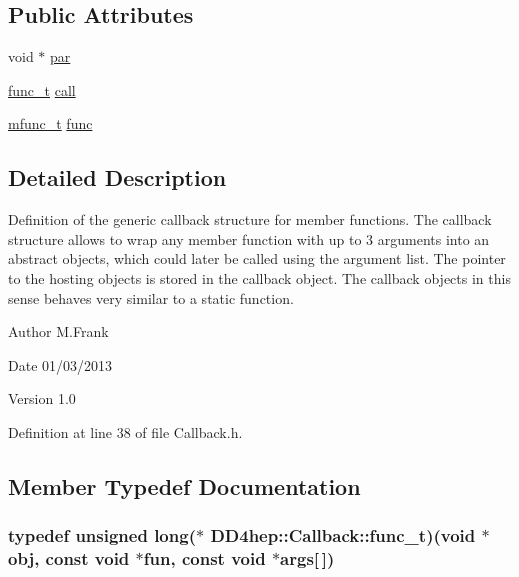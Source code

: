 \subsection*{Public Attributes}
\begin{DoxyCompactItemize}
\item 
void $\ast$ \hyperlink{class_d_d4hep_1_1_callback_a0a6ca86dc357627c3c8e9f6233444733}{par}
\item 
\hyperlink{class_d_d4hep_1_1_callback_a3b7cb36fa166495663680601ba5d7fe0}{func\_\-t} \hyperlink{class_d_d4hep_1_1_callback_af278c88d3680465912b88ad74b0d4cff}{call}
\item 
\hyperlink{struct_d_d4hep_1_1_callback_1_1mfunc__t}{mfunc\_\-t} \hyperlink{class_d_d4hep_1_1_callback_a9998721dd74f6377d4c5e71629411426}{func}
\end{DoxyCompactItemize}


\subsection{Detailed Description}
Definition of the generic callback structure for member functions. The callback structure allows to wrap any member function with up to 3 arguments into an abstract objects, which could later be called using the argument list. The pointer to the hosting objects is stored in the callback object. The callback objects in this sense behaves very similar to a static function.

\begin{DoxyAuthor}{Author}
M.Frank 
\end{DoxyAuthor}
\begin{DoxyDate}{Date}
01/03/2013 
\end{DoxyDate}
\begin{DoxyVersion}{Version}
1.0 
\end{DoxyVersion}


Definition at line 38 of file Callback.h.

\subsection{Member Typedef Documentation}
\hypertarget{class_d_d4hep_1_1_callback_a3b7cb36fa166495663680601ba5d7fe0}{
\subsubsection[{func\_\-t}]{\setlength{\rightskip}{0pt plus 5cm}typedef unsigned long($\ast$ {\bf DD4hep::Callback::func\_\-t})(void $\ast$obj, const void $\ast$fun, const void $\ast$args\mbox{[}$\,$\mbox{]})}}
\label{class_d_d4hep_1_1_callback_a3b7cb36fa166495663680601ba5d7fe0}


